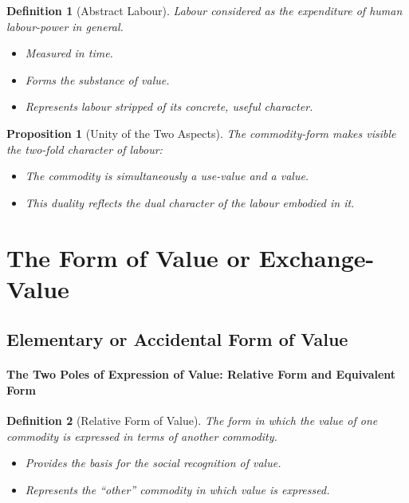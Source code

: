 \documentclass{article}
\newtheorem{innerdef}{Definition}
\newtheorem{innerprop}{Proposition}
\newenvironment{definition}{\begin{innerdef}}{\end{innerdef}}
\newenvironment{proposition}{\begin{innerprop}}{\end{innerprop}}
\begin{document}
\begin{definition}[Abstract Labour]\label{def:1.1.2.2}
Labour considered as the expenditure of human labour-power in general.
\begin{itemize}[noitemsep]
  \item Measured in time.
  \item Forms the substance of value.
  \item Represents labour stripped of its concrete, useful character.
\end{itemize}
\end{definition}

\begin{proposition}[Unity of the Two Aspects]\label{prop:1.1.2.2}
The commodity-form makes visible the two-fold character of labour:
\begin{itemize}[noitemsep]
  \item The commodity is simultaneously a use-value and a value.
  \item This duality reflects the dual character of the labour embodied in it.
\end{itemize}
\end{proposition}

\newpage

\section{The Form of Value or Exchange-Value}

\subsection{Elementary or Accidental Form of Value}

\paragraph{The Two Poles of Expression of Value: Relative Form and Equivalent Form}

\begin{definition}[Relative Form of Value]
The form in which the value of one commodity is expressed in terms of another commodity.
\begin{itemize}[noitemsep]
    \item Provides the basis for the social recognition of value.
    \item Represents the “other” commodity in which value is expressed.
\end{itemize}
\end{definition}
\end{document}

